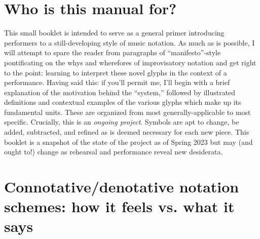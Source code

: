 \documentclass[twoside, 11pt]{book}
\begin{document}
    \section{Who is this manual for?}

    This small booklet is intended to serve as a general primer introducing performers to a still-developing style of music notation. As much as is possible, I will attempt to spare the reader from paragraphs of ``manifesto''-style pontificating on the whys and wherefores of improvisatory notation and get right to the point: learning to interpret these novel glyphs in the context of a performance. Having said this: if you'll permit me, I'll begin with a brief explanation of the motivation behind the ``system,'' followed by illustrated definitions and contextual examples of the various glyphs which make up its fundamental units. These are organized from most generally-applicable to most specific. Crucially, this is an \textit{ongoing project}. Symbols are apt to change, be added, subtracted, and refined as is deemed necessary for each new piece. This booklet is a snapshot of the state of the project as of Spring 2023 but may (and ought to!) change as rehearsal and performance reveal new desiderata.
    

    \section{Connotative/denotative notation schemes: how it feels vs. what it says}
\end{document}
